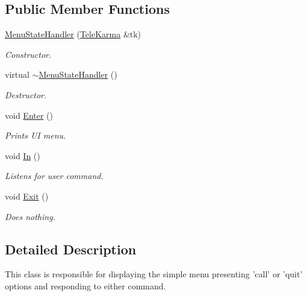 \subsection*{Public Member Functions}
\begin{CompactItemize}
\item 
\hyperlink{classMenuStateHandler_432b787055df296308029da13cbf48e6}{MenuStateHandler} (\hyperlink{classTeleKarma}{TeleKarma} \&tk)
\begin{CompactList}\small\item\em Constructor. \item\end{CompactList}\item 
virtual \hyperlink{classMenuStateHandler_e9c7e8689f7264102a347e4c482927b2}{$\sim$MenuStateHandler} ()
\begin{CompactList}\small\item\em Destructor. \item\end{CompactList}\item 
void \hyperlink{classMenuStateHandler_b38fbf0fdf66be47ebb7e200a66925ba}{Enter} ()
\begin{CompactList}\small\item\em Prints UI menu. \item\end{CompactList}\item 
void \hyperlink{classMenuStateHandler_4254cddbdf883ec3efb2e1d0329d2200}{In} ()
\begin{CompactList}\small\item\em Listens for user command. \item\end{CompactList}\item 
void \hyperlink{classMenuStateHandler_57ad1a8b97f4a4aabe30ea007c8afa73}{Exit} ()
\begin{CompactList}\small\item\em Does nothing. \item\end{CompactList}\end{CompactItemize}


\subsection{Detailed Description}
This class is responsible for displaying the simple menu presenting 'call' or 'quit' options and responding to either command. 


